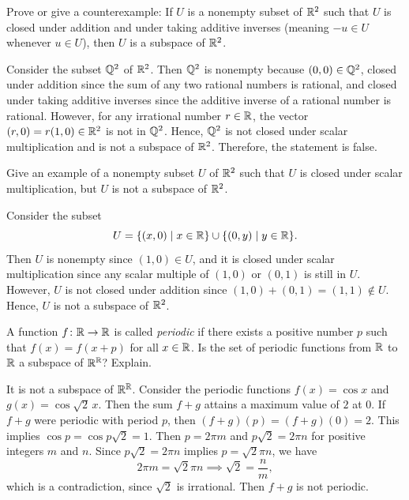 \begin{exc}
\begin{exercise}
Prove or give a counterexample: If $U$ is a nonempty subset of $\mathbb{R}^2$ such that
$U$ is closed under addition and under taking additive inverses (meaning
$-u\in U$ whenever $u\in U$), then $U$ is a subspace of $\mathbb{R}^2$.
\end{exercise}
\begin{solution}
Consider the subset $\mathbb{Q}^2$ of $\mathbb{R}^2$. Then $\mathbb{Q}^2$ is nonempty because
$(0,0)\in\mathbb{Q}^2$, closed under addition since the sum of any two rational numbers
is rational, and closed under taking additive inverses since the additive
inverse of a rational number is rational. However, for any irrational number
$r\in\mathbb{R}$, the vector $(r,0)=r(1,0)\in\mathbb{R}^2$ is not in $\mathbb{Q}^2$. Hence, $\mathbb{Q}^2$ is
not closed under scalar multiplication and is not a subspace of $\mathbb{R}^2$.
Therefore, the statement is false.
\end{solution}

\begin{exercise}
Give an example of a nonempty subset $U$ of $\mathbb{R}^2$ such that $U$ is closed
under scalar multiplication, but $U$ is not a subspace of $\mathbb{R}^2$.
\end{exercise}
\begin{solution}
Consider the subset
\[ U = \{(x,0) \mid x\in\mathbb{R}\}\cup\{(0,y) \mid y\in\mathbb{R}\}. \]
Then $U$ is nonempty since $(1,0)\in U$, and it is closed under scalar
multiplication since any scalar multiple of $(1,0)$ or $(0,1)$ is still in
$U$. However, $U$ is not closed under addition since
$(1,0)+(0,1)=(1,1)\notin U$. Hence, $U$ is not a subspace of $\mathbb{R}^2$.
\end{solution}

\begin{exercise}
A function $f\colon\mathbb{R}\to\mathbb{R}$ is called \emph{periodic} if there exists a
positive number $p$ such that $f(x)=f(x+p)$ for all $x\in\mathbb{R}$. Is the set of
periodic functions from $\mathbb{R}$ to $\mathbb{R}$ a subspace of $\mathbb{R}^{\mathbb{R}}$? Explain.
\end{exercise}
\begin{solution}
It is not a subspace of $\mathbb{R}^{\mathbb{R}}$. Consider the periodic functions
$f(x)=\cos x$ and $g(x)=\cos\sqrt2\,x$. Then the sum $f+g$ attains a maximum
value of $2$ at $0$. If $f+g$ were periodic with period $p$, then
$(f+g)(p)=(f+g)(0)=2$. This implies $\cos p=\cos p\sqrt2=1$. Then $p=2\pi m$
and $p\sqrt2=2\pi n$ for positive integers $m$ and $n$. Since $p\sqrt2=2\pi n$
implies $p=\sqrt2\pi n$, we have
\[ 2\pi m = \sqrt2\pi n \implies \sqrt2 = \frac nm, \]
which is a contradiction, since $\sqrt2$ is irrational. Then $f+g$ is not
periodic.
\end{solution}


\end{exc}
